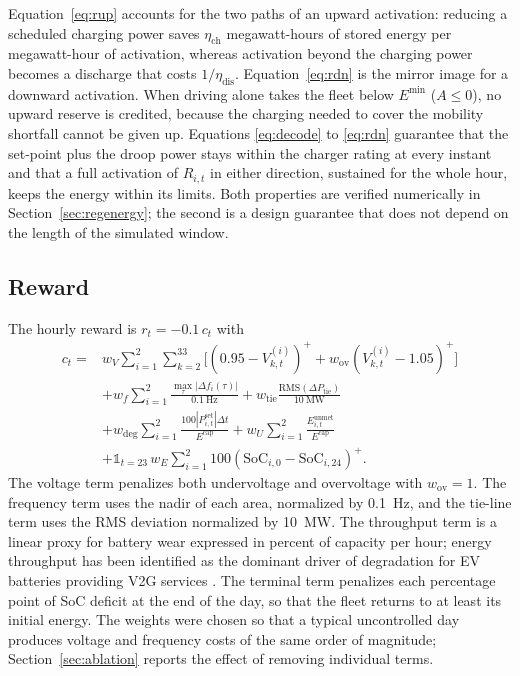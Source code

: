 Equation~\eqref{eq:rup} accounts for the two paths of an upward
activation: reducing a scheduled charging power saves
$\eta_{\mathrm{ch}}$ megawatt-hours of stored energy per megawatt-hour
of activation, whereas activation beyond the charging power becomes a
discharge that costs $1/\eta_{\mathrm{dis}}$. Equation~\eqref{eq:rdn}
is the mirror image for a downward activation. When driving alone
takes the fleet below $E^{\min}$ ($A\le0$), no upward reserve is
credited, because the charging needed to cover the mobility shortfall
cannot be given up. Equations \eqref{eq:decode} to \eqref{eq:rdn}
guarantee that the set-point plus the droop power stays within the
charger rating at every instant and that a full activation of
$R_{i,t}$ in either direction, sustained for the whole hour, keeps the
energy within its limits. Both properties are verified numerically in
Section~\ref{sec:regenergy}; the second is a design guarantee that does
not depend on the length of the simulated window.

\subsection{Reward}
\label{sec:reward}

The hourly reward is $r_t=-0.1\,c_t$ with
\begin{align}
c_t={}&w_V\sum_{i=1}^{2}\sum_{k=2}^{33}\Big[(0.95-V_{k,t}^{(i)})^{+}
+w_{\mathrm{ov}}(V_{k,t}^{(i)}-1.05)^{+}\Big]\nonumber\\
&+w_f\sum_{i=1}^{2}\frac{\max_\tau|\Delta f_i(\tau)|}{0.1~\mathrm{Hz}}
+w_{\mathrm{tie}}\frac{\mathrm{RMS}(\Delta P_{\mathrm{tie}})}{10~\mathrm{MW}}\nonumber\\
&+w_{\mathrm{deg}}\sum_{i=1}^{2}\frac{100|P^{\mathrm{set}}_{i,t}|\Delta t}{E^{\mathrm{cap}}}
+w_U\sum_{i=1}^{2}\frac{E^{\mathrm{unmet}}_{i,t}}{E^{\mathrm{cap}}}\nonumber\\
&+\mathbb{1}_{t=23}\,w_E\sum_{i=1}^{2}100\left(\mathrm{SoC}_{i,0}-\mathrm{SoC}_{i,24}\right)^{+}.
\label{eq:cost}
\end{align}
The voltage term penalizes both undervoltage and overvoltage with
$w_{\mathrm{ov}}=1$. The frequency term uses the nadir of each area,
normalized by 0.1~Hz, and the tie-line term uses the RMS deviation
normalized by 10~MW. The throughput term is a linear proxy for battery
wear expressed in percent of capacity per hour; energy throughput has
been identified as the dominant driver of degradation for EV batteries
providing V2G services \cite{Bishop2013}. The terminal term
penalizes each percentage point of SoC deficit at the end of the day,
so that the fleet returns to at least its initial energy. The weights
were chosen so that a typical uncontrolled day produces voltage and
frequency costs of the same order of magnitude; Section~\ref{sec:ablation}
reports the effect of removing individual terms.

